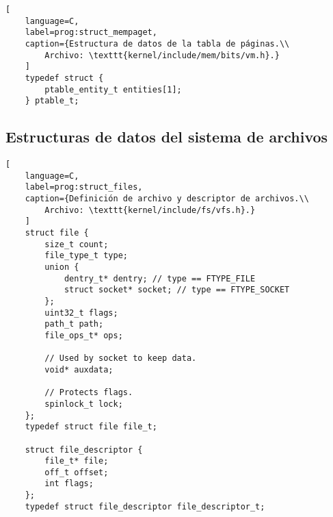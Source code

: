\begin{lstlisting}[
	language=C,
	label=prog:struct_mempaget,
	caption={Estructura de datos de la tabla de páginas.\\
		Archivo: \texttt{kernel/include/mem/bits/vm.h}.}
	]
	typedef struct {
		ptable_entity_t entities[1];
	} ptable_t;
\end{lstlisting}


\newpage
\subsection{Estructuras de datos del sistema de archivos}
\begin{lstlisting}[
	language=C,
	label=prog:struct_files,
	caption={Definición de archivo y descriptor de archivos.\\
		Archivo: \texttt{kernel/include/fs/vfs.h}.}
	]
	struct file {
		size_t count;
		file_type_t type;
		union {
			dentry_t* dentry; // type == FTYPE_FILE
			struct socket* socket; // type == FTYPE_SOCKET
		};
		uint32_t flags;
		path_t path;
		file_ops_t* ops;
		
		// Used by socket to keep data.
		void* auxdata;
		
		// Protects flags.
		spinlock_t lock;
	};
	typedef struct file file_t;
	
	struct file_descriptor {
		file_t* file;
		off_t offset;
		int flags;
	};
	typedef struct file_descriptor file_descriptor_t;
\end{lstlisting}

